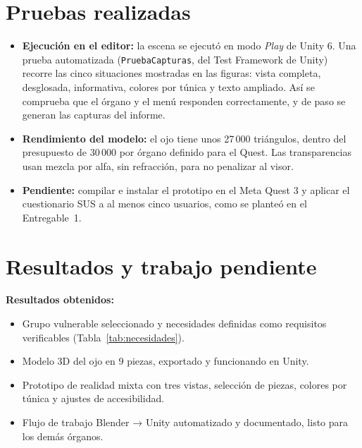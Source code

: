 \documentclass[11pt,a4paper]{article}
\begin{document}
\section{Pruebas realizadas}
\begin{itemize}
    \item \textbf{Ejecución en el editor:} la escena se ejecutó en modo \emph{Play} de Unity 6. Una prueba automatizada (\texttt{PruebaCapturas}, del Test Framework de Unity) recorre las cinco situaciones mostradas en las figuras: vista completa, desglosada, informativa, colores por túnica y texto ampliado. Así se comprueba que el órgano y el menú responden correctamente, y de paso se generan las capturas del informe.
    \item \textbf{Rendimiento del modelo:} el ojo tiene unos 27\,000 triángulos, dentro del presupuesto de 30\,000 por órgano definido para el Quest. Las transparencias usan mezcla por alfa, sin refracción, para no penalizar al visor.
    \item \textbf{Pendiente:} compilar e instalar el prototipo en el Meta Quest 3 y aplicar el cuestionario SUS a al menos cinco usuarios, como se planteó en el Entregable~1.
\end{itemize}

\section{Resultados y trabajo pendiente}
\textbf{Resultados obtenidos:}
\begin{itemize}
    \item Grupo vulnerable seleccionado y necesidades definidas como requisitos verificables (Tabla~\ref{tab:necesidades}).
    \item Modelo 3D del ojo en 9 piezas, exportado y funcionando en Unity.
    \item Prototipo de realidad mixta con tres vistas, selección de piezas, colores por túnica y ajustes de accesibilidad.
    \item Flujo de trabajo Blender → Unity automatizado y documentado, listo para los demás órganos.
\end{itemize}
\end{document}
